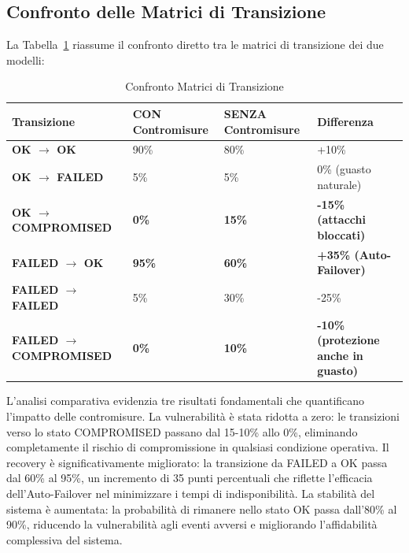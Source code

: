 \subsection{Confronto delle Matrici di Transizione}
La Tabella~\ref{tab:confronto-matrici} riassume il confronto diretto tra le matrici di transizione dei due modelli:
\begin{table}[H]
\centering
\label{tab:confronto-matrici}
\begin{tabularx}{\textwidth}{|l|X|X|X|}
\hline
\textbf{Transizione} & \textbf{CON Contromisure} & \textbf{SENZA Contromisure} & \textbf{Differenza} \\ \hline
\textbf{OK $\to$ OK} & 90\% & 80\% & +10\% \\ \hline
\textbf{OK $\to$ FAILED} & 5\% & 5\% & 0\% (guasto naturale) \\ \hline
\textbf{OK $\to$ COMPROMISED} & \textbf{0\%} & \textbf{15\%} & \textbf{-15\% (attacchi bloccati)} \\ \hline
\textbf{FAILED $\to$ OK} & \textbf{95\%} & \textbf{60\%} & \textbf{+35\% (Auto-Failover)} \\ \hline
\textbf{FAILED $\to$ FAILED} & 5\% & 30\% & -25\% \\ \hline
\textbf{FAILED $\to$ COMPROMISED} & \textbf{0\%} & \textbf{10\%} & \textbf{-10\% (protezione anche in guasto)} \\ \hline
\end{tabularx}
\caption{Confronto Matrici di Transizione}
\end{table}

L'analisi comparativa evidenzia tre risultati fondamentali che quantificano l'impatto delle contromisure. La vulnerabilità è stata ridotta a zero: le transizioni verso lo stato COMPROMISED passano dal 15-10\% allo 0\%, eliminando completamente il rischio di compromissione in qualsiasi condizione operativa. Il recovery è significativamente migliorato: la transizione da FAILED a OK passa dal 60\% al 95\%, un incremento di 35 punti percentuali che riflette l'efficacia dell'Auto-Failover nel minimizzare i tempi di indisponibilità. La stabilità del sistema è aumentata: la probabilità di rimanere nello stato OK passa dall'80\% al 90\%, riducendo la vulnerabilità agli eventi avversi e migliorando l'affidabilità complessiva del sistema.

